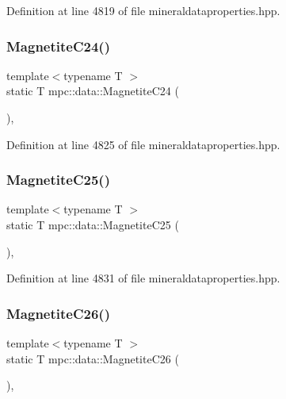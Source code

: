 Definition at line 4819 of file mineraldataproperties.\+hpp.

\mbox{\label{namespacempc_1_1data_ad2175c028279ed0e8995d2862e4e935b}} 
\subsubsection{\texorpdfstring{Magnetite\+C24()}{MagnetiteC24()}}
{\footnotesize\ttfamily template$<$typename T $>$ \\
static T mpc\+::data\+::\+Magnetite\+C24 (\begin{DoxyParamCaption}{ }\end{DoxyParamCaption})\hspace{0.3cm}{\ttfamily [inline]}, {\ttfamily [static]}}



Definition at line 4825 of file mineraldataproperties.\+hpp.

\mbox{\label{namespacempc_1_1data_acb6d4b8d8e75c1f5615eea52b858d7ea}} 
\subsubsection{\texorpdfstring{Magnetite\+C25()}{MagnetiteC25()}}
{\footnotesize\ttfamily template$<$typename T $>$ \\
static T mpc\+::data\+::\+Magnetite\+C25 (\begin{DoxyParamCaption}{ }\end{DoxyParamCaption})\hspace{0.3cm}{\ttfamily [inline]}, {\ttfamily [static]}}



Definition at line 4831 of file mineraldataproperties.\+hpp.

\mbox{\label{namespacempc_1_1data_a571e718bc6125526ae121f770ab7e05a}} 
\subsubsection{\texorpdfstring{Magnetite\+C26()}{MagnetiteC26()}}
{\footnotesize\ttfamily template$<$typename T $>$ \\
static T mpc\+::data\+::\+Magnetite\+C26 (\begin{DoxyParamCaption}{ }\end{DoxyParamCaption})\hspace{0.3cm}{\ttfamily [inline]}, {\ttfamily [static]}}



